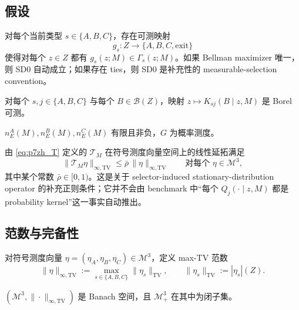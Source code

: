 \subsection{假设}

\begin{assumption}
对每个当前类型 $s\in\{A,B,C\}$，存在可测映射
\[
g_s:Z\to\{A,B,C,\mathrm{exit}\}
\]
使得对每个 $z\in Z$ 都有 $g_s(z;M)\in\Gamma_s(z;M)$。如果 Bellman maximizer 唯一，则 SD0 自动成立；如果存在 ties，则 SD0 是补充性的 measurable-selection convention。
\end{assumption}

\begin{assumption}[SD1：核可测]
对每个 $s,j\in\{A,B,C\}$ 与每个 $B\in\mathcal B(Z)$，映射 $z\mapsto K_{sj}(B\mid z,M)$ 是 Borel 可测。
\end{assumption}

\begin{assumption}[SD2：进入流有限]
$n_E^A(M),n_E^B(M),n_E^C(M)$ 有限且非负，$G$ 为概率测度。
\end{assumption}

\begin{assumption}[SD3：算子层面的压缩正则条件]
由 \eqref{eq:p7zh_T} 定义的 $\mathcal T_M$ 在符号测度向量空间上的线性延拓满足
\begin{equation}
\|\mathcal T_M\eta\|_{\infty,\mathrm{TV}}
\le
\bar\rho\,\|\eta\|_{\infty,\mathrm{TV}}
\qquad\text{对每个 }\eta\in\mathcal M^3,
\label{eq:p7zh_operator_contraction}
\end{equation}
其中某个常数 $\bar\rho\in[0,1)$。这是关于 selector-induced stationary-distribution operator 的补充正则条件；它并不会由 benchmark 中“每个 $Q_j(\cdot\mid z,M)$ 都是 probability kernel”这一事实自动推出。
\end{assumption}

\subsection{范数与完备性}

对符号测度向量 $\eta=(\eta_A,\eta_B,\eta_C)\in\mathcal M^3$，定义 max-TV 范数
\begin{equation}
\|\eta\|_{\infty,\mathrm{TV}}:=\max_{s\in\{A,B,C\}}\|\eta_s\|_{\mathrm{TV}},
\qquad
\|\eta_s\|_{\mathrm{TV}}:=|\eta_s|(Z).
\label{eq:p7zh_norm}
\end{equation}

\begin{lemma}[完备性]
$(\mathcal M^3,\|\cdot\|_{\infty,\mathrm{TV}})$ 是 Banach 空间，且 $\mathcal M_+^3$ 在其中为闭子集。
\end{lemma}

